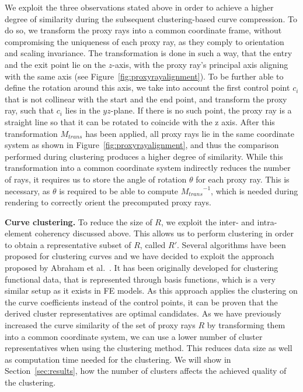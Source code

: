 \documentclass[journal]{vgtc}                %
\begin{document}
We exploit the three observations stated above in order to achieve a higher degree of similarity during the subsequent clustering-based curve compression. To do so, we transform the proxy rays into a common coordinate frame, without compromising the uniqueness of each proxy ray, as they comply to orientation and scaling invariance. The transformation is done in such a way, that the entry and the exit point lie on the $z$-axis, with the proxy ray's principal axis aligning with the same axis (see Figure~\ref{fig:proxyrayalignment}). To be further able to define the rotation around this axis, we take into account the first control point $c_i$ that is not collinear with the start and the end point, and transform the proxy ray, such that $c_i$ lies in the $yz$-plane. If there is no such point, the proxy ray is a straight line so that it can be rotated to coincide with the z axis. After this transformation $M_{trans}$ has been applied, all proxy rays lie in the same coordinate system as shown in Figure~\ref{fig:proxyrayalignment}, and thus the comparison performed during clustering produces a higher degree of similarity. While this transformation into a common coordinate system indirectly reduces the number of rays, it requires us to store the angle of rotation $\theta$ for each proxy ray. This is necessary, as $\theta$ is required to be able to compute ${M_{trans}}^{-1}$, which is needed during rendering to correctly orient the precomputed proxy rays.

\noindent \textbf{Curve clustering.} To reduce the size of $R$, we exploit the inter- and intra-element coherency discussed above. This allows us to perform clustering in order to obtain a representative subset of $R$, called $R'$. Several algorithms have been proposed for clustering curves and we have decided to exploit the approach proposed by Abraham et al.~\cite{abraham03clustering}. It has been originally developed for clustering functional data, that is represented through basis functions, which is a very similar setup as it exists in FE models. As this approach applies the clustering on the curve coefficients instead of the control points, it can be proven that the derived cluster representatives are optimal candidates. As we have previously increased the curve similarity of the set of proxy rays $R$ by transforming them into a common coordinate system, we can use a lower number of cluster representatives when using the clustering method. This reduces data size as well as computation time needed for the clustering. We will show in Section~\ref{sec:results}, how the number of clusters affects the achieved quality of the clustering.
\end{document}
